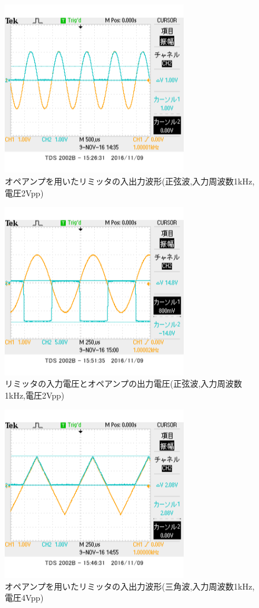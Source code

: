 \documentclass[11pt,a4j]{jsarticle}
\begin{document}
    \begin{figure}[htbp]
  \centering
  \includegraphics[width=8cm,clip]{1_1_ampFG_f1V2_ViVo.png}
  \caption{オペアンプを用いたリミッタの入出力波形(正弦波,入力周波数1kHz,電圧2Vpp)}
  \label{fig:ampFGf1v2vivo}
 \end{figure}%
 
 \begin{figure}[htbp]
  \centering
  \includegraphics[width=8cm,clip]{1_1_ampFG_f1V2_ViVa.png}
  \caption{リミッタの入力電圧とオペアンプの出力電圧(正弦波,入力周波数1kHz,電圧2Vpp)}
  \label{fig:ampFGf1v2viva}
 \end{figure}%
 
 \begin{figure}[htbp]
  \centering
  \includegraphics[width=8cm,clip]{1_1_ampFG_f1V4sankaku_ViVo.png}
  \caption{オペアンプを用いたリミッタの入出力波形(三角波,入力周波数1kHz,電圧4Vpp)}
  \label{fig:ampFGf1v4vivo}
 \end{figure}%
 
\end{document}
